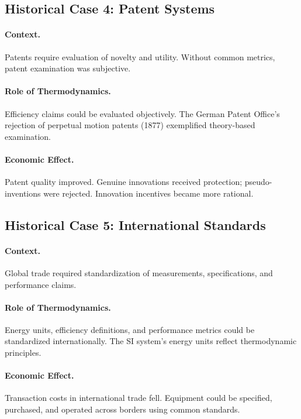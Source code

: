 \subsection{Historical Case 4: Patent Systems}

\paragraph{Context.} Patents require evaluation of novelty and utility.
Without common metrics, patent examination was subjective.

\paragraph{Role of Thermodynamics.} Efficiency claims could be evaluated
objectively. The German Patent Office's rejection of perpetual motion
patents (1877) exemplified theory-based examination.

\paragraph{Economic Effect.} Patent quality improved. Genuine innovations
received protection; pseudo-inventions were rejected. Innovation incentives
became more rational.

\subsection{Historical Case 5: International Standards}

\paragraph{Context.} Global trade required standardization of measurements,
specifications, and performance claims.

\paragraph{Role of Thermodynamics.} Energy units, efficiency definitions,
and performance metrics could be standardized internationally. The SI
system's energy units reflect thermodynamic principles.

\paragraph{Economic Effect.} Transaction costs in international trade fell.
Equipment could be specified, purchased, and operated across borders using
common standards.



